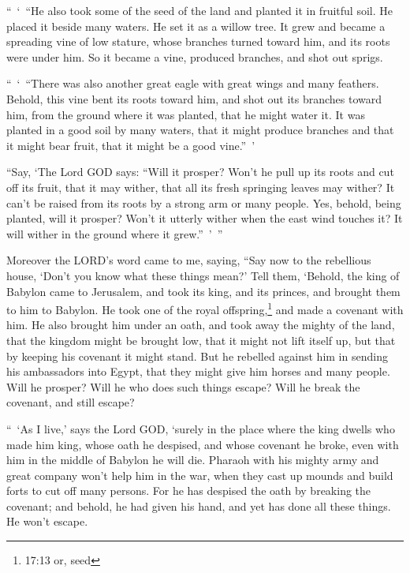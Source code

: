 \myverse{}“ ‘ “He also took some of the seed of the land and planted it in
fruitful soil. He placed it beside many waters. He set it as a willow tree.
\myverse{}It grew and became a spreading vine of low stature, whose branches turned toward
him, and its roots were under him. So it became a vine, produced branches, and shot out sprigs.

\myverse{}“ ‘ “There was also another great eagle with great wings and many
feathers. Behold, this vine bent its roots toward him, and shot out its branches toward him, from the
ground where it was planted, that he might water it.
\myverse{}It was planted in a good soil by many waters, that it might produce branches
and that it might bear fruit, that it might be a good vine.” ’

\myverse{}“Say, ‘The Lord GOD says: “Will it prosper? Won’t he pull up its
roots and cut off its fruit, that it may wither, that all its fresh springing leaves may wither? It can’t
be raised from its roots by a strong arm or many people.
\myverse{}Yes, behold, being planted, will it prosper? Won’t it utterly wither when
the east wind touches it? It will wither in the ground where it grew.” ’ ”

\myverse{}Moreover the LORD’s word came to me, saying,
\myverse{}“Say now to the rebellious house, ‘Don’t you know what these things mean?’
Tell them, ‘Behold, the king of Babylon came to Jerusalem, and took its king, and its princes, and brought
them to him to Babylon.
\myverse{}He took one of the royal offspring,\footnote{17:13 or, seed} and made a covenant with him. He also brought him under an oath, and took away
the mighty of the land,
\myverse{}that the kingdom might be brought low, that it might not lift itself up,
but that by keeping his covenant it might stand.
\myverse{}But he rebelled against him in sending his ambassadors into Egypt, that they
might give him horses and many people. Will he prosper? Will he who does such things escape? Will he break
the covenant, and still escape?

\myverse{}“ ‘As I live,’ says the Lord GOD, ‘surely in the place where
the king dwells who made him king, whose oath he despised, and whose covenant he broke, even with him
in the middle of Babylon he will die.
\myverse{}Pharaoh with his mighty army and great company won’t help him in the war,
when they cast up mounds and build forts to cut off many persons.
\myverse{}For he has despised the oath by breaking the covenant; and behold, he had
given his hand, and yet has done all these things. He won’t escape.

